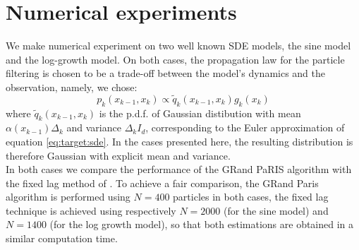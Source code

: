 \documentclass[12pt]{article}
\newcommand{\1}{\mathrm{1}}
\begin{document}
\section{Numerical experiments}
\label{sec:exp}
We make numerical experiment on two well known SDE models, the sine model and the log-growth model. On both cases, the propagation law for the particle filtering is chosen to be a trade-off between the model's dynamics and the observation, namely, we chose:
$$p_k(x_{k-1},x_k)\propto \tilde{q}_k(x_{k-1}, x_k)g_k(x_{k})$$
where $\tilde{q}_k(x_{k-1},x_k)$ is the p.d.f. of Gaussian distibution with mean $\alpha(x_{k-1})\Delta_k$ and variance $\Delta_kI_d$, corresponding to the Euler approximation of equation \eqref{eq:target:sde}. In the cases presented here, the resulting distribution is therefore Gaussian with explicit mean and variance.\\
In both cases we compare the performance of the GRand PaRIS algorithm with the fixed lag method of \cite{olsson:strojby:2011}. To achieve a fair comparison, the GRand Paris algorithm is performed using $N=400$ particles in both cases, the fixed lag technique is achieved using respectively $N=2000$ (for the sine model) and $N=1400$ (for the log growth model), so that both estimations are obtained in a similar computation time.
\end{document}
